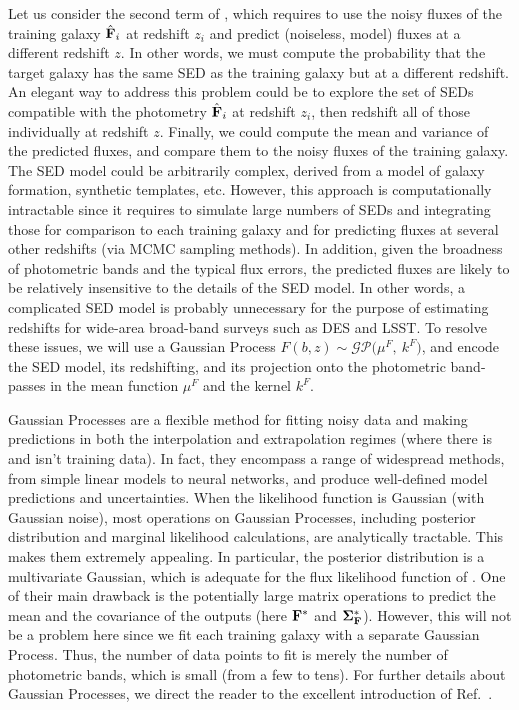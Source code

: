 \documentclass[aps,prd,showpacs,superscriptaddress,groupedaddress]{revtex4}  %
\begin{document}
Let us consider the second term of , which requires to use the noisy fluxes of the training galaxy $\hat{\mat{F}}_i$ at redshift $z_i$ and predict (noiseless, model) fluxes at a different redshift $z$.
In other words, we must compute the probability that the target galaxy has the same SED as the training galaxy but at a different redshift. 
An elegant way to address this problem could be to explore the set of SEDs compatible with the photometry $\hat{\mat{F}}_i$ at redshift $z_i$, then redshift all of those individually at redshift $z$. Finally, we could compute the mean and variance of the predicted fluxes, and compare them to the noisy fluxes of the training galaxy.
The SED model could be arbitrarily complex, \eg derived from a model of galaxy formation, synthetic templates, etc. 
However, this approach is computationally intractable since it requires to simulate large numbers of SEDs and integrating those for comparison to each training galaxy and for predicting fluxes at several other redshifts (\eg via MCMC sampling methods). 
In addition, given the broadness of photometric bands and the typical flux errors, the predicted fluxes are likely to be relatively insensitive to the details of the SED model. 
In other words, a complicated SED model is probably unnecessary for the purpose of estimating redshifts for wide-area broad-band surveys such as DES and LSST.
To resolve these issues, we will use a Gaussian Process $F(b, z) \sim \mathcal{GP}\bigl( \mu^F, \ k^F\bigr)$, and encode the SED model, its redshifting, and its projection onto the photometric band-passes in the mean function $\mu^F$ and the kernel $k^F$. 

Gaussian Processes are a flexible method for fitting noisy data and making predictions in both the interpolation and extrapolation regimes (\ie where there is and isn't training data).
In fact, they encompass a range of widespread methods, from simple linear models to neural networks, and produce well-defined model predictions and uncertainties.
When the likelihood function is Gaussian (\eg with Gaussian noise), most operations on Gaussian Processes, including posterior distribution and marginal likelihood calculations, are analytically tractable.
This makes them extremely appealing.
In particular, the posterior distribution is a multivariate Gaussian, which is adequate for the flux likelihood function of . 
One of their main drawback is the potentially large matrix operations to predict the mean and the covariance of the outputs (here $\mat{F}^*$ and $\mat{\Sigma^*_{{\mat{F}}}}$). 
However, this will not be a problem here since we fit each training galaxy with a separate Gaussian Process.
Thus, the number of data points to fit is merely the number of photometric bands, which is small (from a few to tens).
For further details about Gaussian Processes, we direct the reader to the excellent introduction of Ref.~\cite{Rasmussen:2005}.
\end{document}
